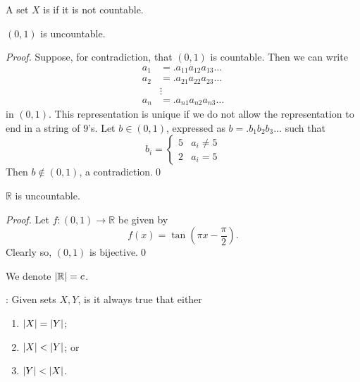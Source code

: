 \documentclass[notoc,notitlepage]{tufte-book}
\begin{document}
\begin{defn}[Uncountable]\label{defn:uncountable}
  A set $X$ is  if it is not countable.
\end{defn}

\begin{thm}\label{thm:cantor_s_diagonal_argument}
  $(0, 1)$ is uncountable.
\end{thm}

\begin{proof}
  Suppose, for contradiction, that $(0, 1)$ is countable. Then we can write
  \begin{align*}
    a_1 &=.a_{11} a_{12} a_{13} \ldots \\
    a_2 &=.a_{21} a_{22} a_{23} \ldots \\
        &\vdots \\
    a_n &=.a_{n1} a_{n2} a_{n3} \ldots
  \end{align*}
  in $(0, 1)$. This representation is unique if we do not allow the representation to end in a string of $9$'s. Let $b \in (0, 1)$, expressed as $b =. b_1 b_2 b_3 \ldots$ such that
  \begin{equation*}
    b_i = \begin{cases}
      5 & a_i \neq 5 \\
      2 & a_i = 5
    \end{cases}
  \end{equation*}
  Then $b \notin (0, 1)$, a contradiction.\qed
\end{proof}

\begin{crly}\label{crly:uncountability_of_r}
  $\mathbb{R}$ is uncountable.
\end{crly}

\begin{proof}
  Let $f : (0, 1) \to \mathbb{R}$ be given by
  \begin{equation*}
    f(x) = \tan \left( \pi x - \frac{\pi}{2} \right).
  \end{equation*}
  Clearly so, $(0, 1)$ is bijective.\qed
\end{proof}

\begin{note}
  We denote $\left|\mathbb{R}\right| = c$.
\end{note}

: Given sets $X, Y$, is it always true that either
\begin{enumerate}
  \item $\left|X\right| = \left|Y\right|$;
  \item $\left|X\right| < \left|Y\right|$; or
  \item $\left|Y\right| < \left|X\right|$.
\end{enumerate}
\end{document}
